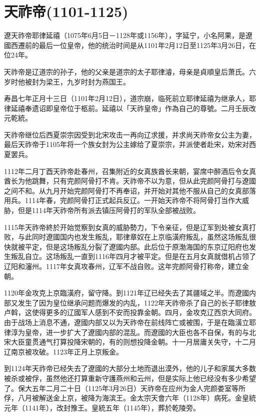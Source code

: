 
\section{天祚帝\tiny(1101-1125)}

遼天祚帝耶律延禧（1075年6月5日－1128年或1156年），字延宁，小名阿果，是遼國西遷前的最后一位皇帝，他的统治时间是从1101年2月12日至1125年3月26日，在位24年。

天祚帝是辽道宗的孙子，他的父亲是道宗的太子耶律濬，母亲是貞順皇后萧氏。六岁时他被封为梁王，九岁时封为燕国王。

寿昌七年正月十三日（1101年2月12日），道宗崩，临死前立耶律延禧为继承人，耶律延禧奉遗诏即皇帝位于柩前。延禧以「天祚皇帝」作為自己的尊號。二月壬辰改元乾統。

天祚帝继位后西夏崇宗因受到北宋攻击一再向辽求援，并求尚天祚帝女公主为妻，最后天祚帝于1105年将一个族女封为公主嫁给了夏崇宗，并派使者赴宋，劝宋对西夏罢兵。

1112年二月丁酉天祚帝赴春州，召集附近的女真族酋长来朝，宴席中醉酒后令女真酋长为他跳舞，只有完颜阿骨打不肯。天祚帝不以为意，但从此完颜阿骨打与遼國之间不和。从九月开始完颜阿骨打不再奉诏，并开始对其他不服从自己的女真部落用兵。1114年春，完颜阿骨打正式起兵反辽。一开始天祚帝不将阿骨打当作大威胁，但是1114年天祚帝所有派去镇压阿骨打的军队全部被战败。

1115年天祚帝終於开始觉察到女真的威胁勢力，下令亲征，但是辽军到处被女真打败，与此同时遼國国内也发生叛乱，耶律章奴在上京临潢府叛乱，虽然这场叛乱很快就被平定，但是这场叛乱分裂了遼國内部。此后位于原渤海国的东京辽阳府也发生叛乱自立。这场叛乱一直到1116年四月才被平定。但是在五月女真就借机占领了辽阳和瀋州。1117年女真攻春州，辽军不战自败。这年完颜阿骨打称帝，建立金朝。

1120年金攻克上京臨潢府，留守降。到1121年辽已经失去了其疆域之半。而遼國内部又发生了因为皇位继承问题而爆发的内乱，1122年天祚帝杀了自己的长子耶律敖卢斡，这使得更多的辽國军人感到不安而投靠金朝。四月，金攻克辽西京大同府。由于战场上消息不通，遼國内部又以为天祚帝在前线阵亡或被围，于是在臨潢立耶律淳为皇帝，进一步扩大了遼國内部的混乱。而遼國的大臣也各不自保，有的与北宋大臣童贯通气打算投降宋朝的，有的则想投降金朝。十一月居庸关失守，十二月辽南京被攻破。1123年正月上京叛金。

到1124年天祚帝已经失去了遼國的大部分土地而退出漠外，他的儿子和家属大多数被杀或被俘，虽然他还打算重新守護燕州和云州，但是实际上他已经没有多少希望了。保大五年二月二十日（1125年3月26日）天祚帝在应州为金人完颜娄室等所俘，八月被解送金上京，被降为海滨王。金太宗天會六年（1128年）病死。金皇統元年（1141年），改封豫王。皇統五年（1145年），葬於乾陵旁。

